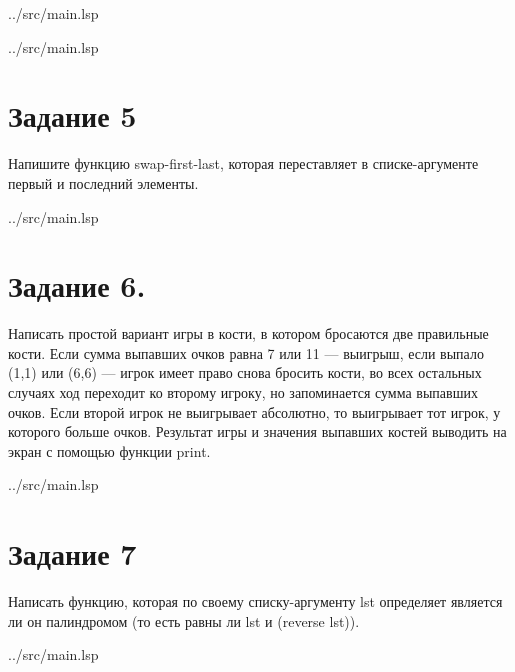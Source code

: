 \begin{lstinputlisting}[
	caption={Задание 4, вариант 1},
	label={lst:t4-1},
	style={lsp},
	linerange={41-53},
	]{../src/main.lsp}
\end{lstinputlisting}

\begin{lstinputlisting}[
	caption={Задание 4, вариант 2},
	label={lst:t4-2},
	style={lsp},
	linerange={55-57},
	]{../src/main.lsp}
\end{lstinputlisting}

\section*{Задание 5}
Напишите   функцию   swap-first-last,   которая   переставляет   в   списке-аргументе первый и последний элементы.

\begin{lstinputlisting}[
	caption={Задание 5},
	label={lst:t5},
	style={lsp},
	linerange={59-66},
	]{../src/main.lsp}
\end{lstinputlisting}

\section*{Задание 6. }
Написать простой вариант игры в кости, в котором бросаются две правильные кости. Если сумма выпавших очков равна 7 или 11   — выигрыш, если выпало (1,1) или (6,6)   — игрок имеет право снова бросить кости, во всех остальных случаях ход переходит ко второму игроку, но запоминается сумма выпавших очков. Если второй игрок не выигрывает абсолютно, то выигрывает тот игрок, у которого больше очков. Результат игры и значения выпавших костей выводить на экран с помощью функции print.

\begin{lstinputlisting}[
	caption={Задание 6},
	label={lst:t6},
	style={lsp},
	linerange={67-127},
	]{../src/main.lsp}
\end{lstinputlisting}

\section*{Задание 7}
Написать функцию, которая по своему списку-аргументу lst определяет является ли он палиндромом (то есть равны ли lst и (reverse lst)).

\begin{lstinputlisting}[
	caption={Задание 7},
	label={lst:t7},
	style={lsp},
	linerange={145-147},
	]{../src/main.lsp}
\end{lstinputlisting}

